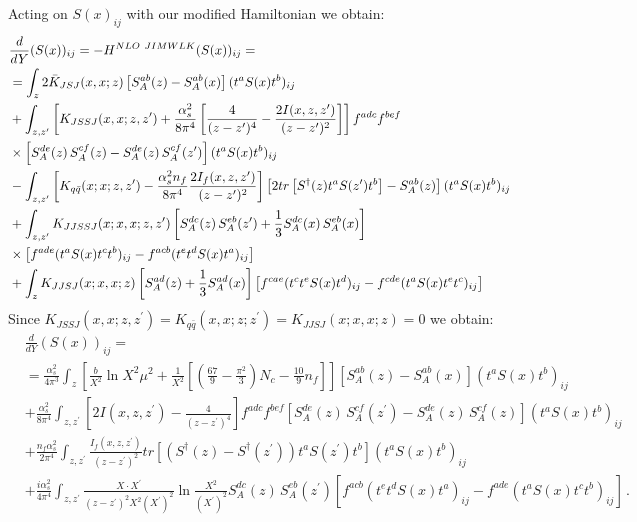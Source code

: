 \documentclass[11pt,a4paper]{article}
\begin{document}
Acting on $S(x)_{ij}$ with our modified Hamiltonian we obtain:
\begin{equation}\begin{split}
&\frac{d}{dY}(S(x))_{ij}=-H^{NLO\ JIMWLK}(S(x))_{ij}=\\
&=\int_{z}2\bar{K}_{JSJ}(x,x;z)\left[S_{A}^{ab}(z)-S_{A}^{ab}(x)\right](t^{a}S(x)t^{b})_{ij} \\
&+\int_{z,z^{\prime}}\left[K_{JSSJ}(x,x;z,z^{\prime})+\frac{\alpha_{s}^{2}}{8\pi^{4}}\left[\frac{4}{(z-z^{\prime})^{4}}-{2I(x,z,z^{\prime})\over (z-z^{\prime})^{2}}\right]\right]f^{adc}f^{bef}\\
&\times \left[S_{A}^{de}(z)\, S_{A}^{cf}(z)-S_{A}^{de}(z)\, S_{A}^{cf}(z^{\prime})\right](t^{a}S(x)t^{b})_{ij}\\
&-\int_{z,z^{\prime}}\left[K_{q\bar{q}}(x;x;z,z^{\prime})-\frac{\alpha_{s}^{2}n_{f}}{8\pi^{4}}\frac{2I_{f}(x,z,z^{\prime})}{(z-z^{\prime})^{2}}\right]\left[2tr\left[S^{\dagger}(z)t^{a}S(z^{\prime})t^{b}\right]-S_{A}^{ab}(z)\right](t^{a}S(x)t^{b})_{ij}\\
&+\int_{z,z^{\prime}}K_{JJSSJ}(x;x,x;z,z^{\prime})\left[S_{A}^{dc}(z)\, S_{A}^{eb}(z^{\prime})+\frac{1}{3}S_{A}^{dc}(x)\, S_{A}^{eb}(x)\right]\\
&\times \left[f^{ade}(t^{a}S(x)t^{c}t^{b})_{ij}-f^{acb}(t^{e}t^{d}S(x)t^{a})_{ij}\right]\\
&+\int_{z}K_{JJSJ}(x;x,x;z)\left[S_{A}^{ad}(z)+\frac{1}{3}S_{A}^{ad}(x)\right]\left[f^{cae}(t^{c}t^{e}S(x)t^{d})_{ij}-f^{cde}(t^{a}S(x)t^{e}t^{c})_{ij}\right]
 \end{split}\end{equation}
Since $K_{JSSJ}(x,x;z,z^{\prime})=K_{q\bar{q}}(x,x;z;z^{\prime})=K_{JJSJ}(x;x,x;z)=0$ we obtain:
\begin{equation}\begin{split}\label{S1we}
&\frac{d}{dY}(S(x))_{ij}=\\
&=\frac{\alpha_{s}^{2}}{4\pi^{3}}\int_{z}\left[\frac{b}{X^{2}}\ln X^{2}\mu^{2}+\frac{1}{X^{2}}\left[\left(\frac{67}{9}-\frac{\pi^{2}}{3}\right)N_{c}-\frac{10}{9}n_{f}\right]\right]\left[S_{A}^{ab}(z)-S_{A}^{ab}(x)\right](t^{a}S(x)t^{b})_{ij}\\
&+\frac{\alpha_{s}^{2}}{8\pi^{4}}\int_{z,z^{\prime}}\left[2I(x,z,z^{\prime})-\frac{4}{(z-z^{\prime})^{4}}\right]f^{adc}f^{bef}\left[S_{A}^{de}(z)\, S_{A}^{cf}(z^{\prime})-S_{A}^{de}(z)\, S_{A}^{cf}(z)\right](t^{a}S(x)t^{b})_{ij}\\
&+\frac{n_{f}\alpha_{s}^{2}}{2\pi^{4}}\int_{z,z^{\prime}}\frac{I_{f}(x,z,z^{\prime})}{(z-z^{\prime})^{2}}tr\left[\left(S^{\dagger}(z)-S^{\dagger}(z^{\prime})\right)t^{a}S(z^{\prime})t^{b}\right](t^{a}S(x)t^{b})_{ij}\\
&+\frac{i\alpha_{s}^{2}}{4\pi^{4}}\int_{z,z^{\prime}}\frac{X\cdot X^{\prime}}{(z-z^{\prime})^{2}X^{2}(X^{\prime})^{2}}\ln\frac{X^{2}}{(X^{\prime})^{2}}S_{A}^{dc}(z)\, S_{A}^{eb}(z^{\prime})\left[f^{acb}(t^{e}t^{d}S(x)t^{a})_{ij}-f^{ade}(t^{a}S(x)t^{c}t^{b})_{ij}\right]\,.\\
 \end{split}\end{equation}
\end{document}
